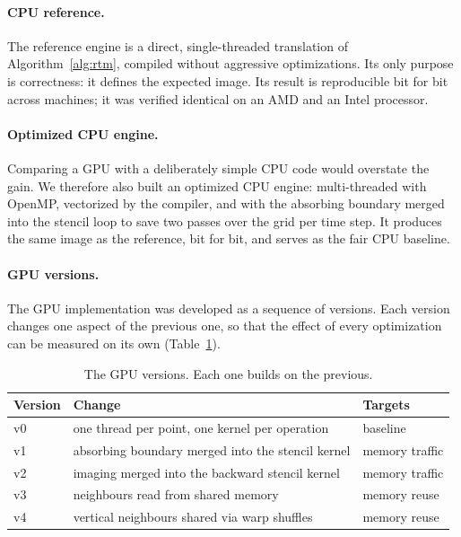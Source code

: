 \documentclass[letterpaper,11pt,leqno]{article}
\begin{document}
\paragraph{CPU reference.}
The reference engine is a direct, single-threaded translation of
Algorithm~\ref{alg:rtm}, compiled without aggressive optimizations. Its only
purpose is correctness: it defines the expected image. Its result is
reproducible bit for bit across machines; it was verified identical on an
AMD and an Intel processor.

\paragraph{Optimized CPU engine.}
Comparing a GPU with a deliberately simple CPU code would overstate the gain.
We therefore also built an optimized CPU engine: multi-threaded with OpenMP,
vectorized by the compiler, and with the absorbing boundary merged into the
stencil loop to save two passes over the grid per time step. It produces the
same image as the reference, bit for bit, and serves as the fair CPU baseline.

\paragraph{GPU versions.}
The GPU implementation was developed as a sequence of versions. Each version
changes one aspect of the previous one, so that the effect of every
optimization can be measured on its own (Table~\ref{tab:versions}).

\begin{table}[H]
\centering
\caption{The GPU versions. Each one builds on the previous.}
\label{tab:versions}
\begin{tabular}{lll}
\toprule
Version & Change                                                & Targets \\
\midrule
v0 & one thread per point, one kernel per operation & baseline \\
v1 & absorbing boundary merged into the stencil kernel          & memory traffic \\
v2 & imaging merged into the backward stencil kernel & memory traffic \\
v3 & neighbours read from shared memory                         & memory reuse \\
v4 & vertical neighbours shared via warp shuffles & memory reuse \\
\bottomrule
\end{tabular}
\end{table}
\end{document}
